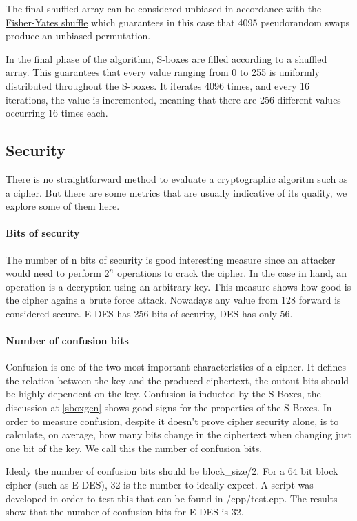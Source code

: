 \documentclass{article} %
\begin{document}
The final shuffled array can be considered unbiased in accordance with the \href{https://en.wikipedia.org/wiki/Fisher%E2%80%93Yates_shuffle}{Fisher-Yates shuffle} which guarantees in this case that 4095 pseudorandom swaps produce an unbiased permutation. 

In the final phase of the algorithm, S-boxes are filled according to a shuffled array. This guarantees that every value ranging from 0 to 255 is uniformly distributed throughout the S-boxes. It iterates 4096 times, and every 16 iterations, the value is incremented, meaning that there are 256 different values occurring 16 times each.


\subsection{Security}
There is no straightforward method to evaluate a cryptographic algoritm such as a cipher. But there are some metrics that are usually indicative of its quality, 
we explore some of them here.

\paragraph{Bits of security}
The number of n bits of security is good interesting measure since an attacker would need to perform $2^{n}$ operations to crack the cipher. In the case in hand, an operation
is a decryption using an arbitrary key. This measure shows how good is the cipher agains a brute force attack.
Nowadays any value from 128 forward is considered secure. E-DES has 256-bits of security, DES has only 56.

\paragraph{Number of confusion bits}
Confusion is one of the two most important characteristics of a cipher. It defines the relation between the key and the produced ciphertext, the outout bits should be 
highly dependent on the key. Confusion is inducted by the S-Boxes, the discussion at \autoref{sboxgen} shows good signs for the properties of the S-Boxes. 
In order to measure confusion, despite it doesn't prove cipher security alone, is to calculate, on average, how many bits change in the 
ciphertext when changing just one bit of the key. We call this the number of confusion bits.

Idealy the number of confusion bits should be block\_size/2. For a 64 bit block cipher (such as E-DES), 32 is the number to ideally expect. A script was developed in order
to test this that can be found in /cpp/test.cpp. The results show that the number of confusion bits for E-DES is 32.
\end{document}
